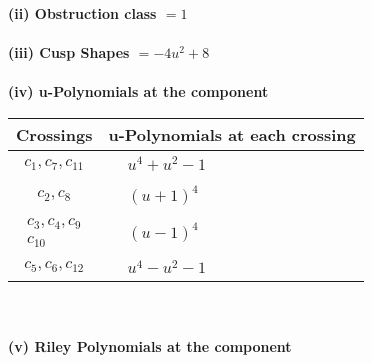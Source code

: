 \documentclass[1p]{elsarticle_modified}
\theoremstyle{definition}
\begin{document}
\flushleft \textbf{(ii) Obstruction class $= 1$}\\~\\
\flushleft \textbf{(iii) Cusp Shapes $= -4 u^2+8$}\\~\\
\newpage\renewcommand{\arraystretch}{1}
\flushleft \textbf{(iv) u-Polynomials at the component}\newline \\
\begin{tabular}{m{50pt}|m{274pt}}
Crossings & \hspace{64pt}u-Polynomials at each crossing \\
\hline $$\begin{aligned}c_{1},c_{7},c_{11}\end{aligned}$$&$\begin{aligned}
&u^4+u^2-1
\end{aligned}$\\
\hline $$\begin{aligned}c_{2},c_{8}\end{aligned}$$&$\begin{aligned}
&(u+1)^4
\end{aligned}$\\
\hline $$\begin{aligned}c_{3},c_{4},c_{9}\\c_{10}\end{aligned}$$&$\begin{aligned}
&(u-1)^4
\end{aligned}$\\
\hline $$\begin{aligned}c_{5},c_{6},c_{12}\end{aligned}$$&$\begin{aligned}
&u^4- u^2-1
\end{aligned}$\\
\hline
\end{tabular}\\~\\
\newpage\renewcommand{\arraystretch}{1}
\flushleft \textbf{(v) Riley Polynomials at the component}\newline \\
\end{document}

